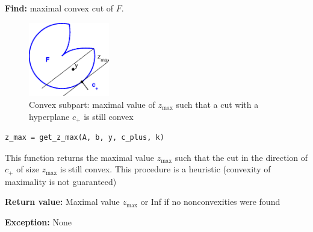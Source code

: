 \documentclass[a4paper]{article}
\theoremstyle{definition}
\begin{document}
\begin{enumerate}
{\bf Find:} maximal convex cut of $F$.

\begin{figure}[H]
	\centering\includegraphics[width=100pt]{get_z_max}
	\caption{Convex subpart: maximal value of $z_{\max}$ such that a cut with a hyperplane $c_+$ is still convex}
\end{figure}

\begin{verbatim}
z_max = get_z_max(A, b, y, c_plus, k)
\end{verbatim}

This function returns the maximal value $z_{\max}$ such that the cut in the direction of $c_+$ of size $z_{\max}$ is still convex. This procedure is a heuristic (convexity of maximality is not guaranteed)

{\bf Return value:} Maximal value $z_{\max}$ or Inf if no nonconvexities were found

{\bf Exception:} None
\end{enumerate}
\end{document}
